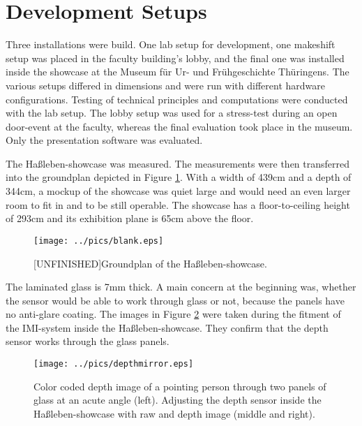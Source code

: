 
%


\section{Development Setups}
\label{setup_development}

Three installations were build. One lab setup for development, one makeshift setup was placed in the faculty building's lobby, and the final one was installed inside the showcase at the Museum für Ur- und Frühgeschichte Thüringens. The various setups differed in dimensions and were run with different hardware configurations. Testing of technical principles and computations were conducted with the lab setup. The lobby setup was used for a stress-test during an open door-event at the faculty, whereas the final evaluation took place in the museum. Only the presentation software was evaluated.

The Haßleben-showcase was measured. The measurements were then transferred into the groundplan depicted in Figure \ref{fig:hassleben_groundplan}. With a width of 439cm and a depth of 344cm, a mockup of the showcase was quiet large and would need an even larger room to fit in and to be still operable. The showcase has a floor-to-ceiling height of 293cm and its exhibition plane is 65cm above the floor.
\begin{figure}[H]%
\texttt{[image: ../pics/blank.eps]}%
\caption{[UNFINISHED]Groundplan of the Haßleben-showcase.}%
\label{fig:hassleben_groundplan} %
\end{figure}

The laminated glass is 7mm thick. A main concern at the beginning was, whether the sensor would be able to work through glass or not, because the panels have no anti-glare coating. The images in Figure \ref{fig:hassleben_glass} were taken during the fitment of the \ac{IMI}-system inside the Haßleben-showcase. They confirm that the depth sensor works through the glass panels.
\begin{figure}[H]%
\texttt{[image: ../pics/depthmirror.eps]}%
\caption{Color coded depth image of a pointing person through two panels of glass at an acute angle (left). Adjusting the depth sensor inside the Haßleben-showcase with raw and depth image (middle and right).}%
\label{fig:hassleben_glass} %
\end{figure}


